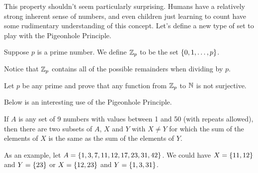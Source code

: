 This property shouldn't seem particularly surprising.  Humans have a relatively strong inherent sense of numbers, and even children just learning to count have some rudimentary understanding of this concept.  Let's define a new type of set to play with the Pigeonhole Principle.

\begin{definition}[$\Z_p$]  Suppose $p$ is a prime number.  We define $\Z_p$ to be the set $\left\{0,1,\ldots,p\right\}$.
\end{definition}

Notice that $\Z_p$ contains all of the possible remainders when dividing by $p$.

\begin{question}[resume]
\item Let $p$ be any prime and prove that any function from $\Z_p$ to $\mathbb{N}$ is not surjective.
\end{question}

\vspace{2in}

\noindent Below is an interesting use of the Pigeonhole Principle.

\begin{claim}  If $A$ is any set of 9 numbers with values between 1 and 50 (with repeats allowed), then there are two subsets of $A$, $X$ and $Y$ with $X\neq Y$ for which the sum of the elements of $X$ is the same as the sum of the elements of $Y$. 
\end{claim}

As an example, let $A=\left\{1,3,7,11,12,17,23,31,42\right\}$.  We could have $X = \left\{11,12\right\}$ and $Y=\left\{23\right\}$ or $X=\left\{12,23\right\}$ and $Y=\left\{1,3,31\right\}$.

